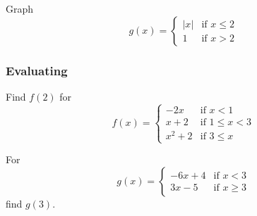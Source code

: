 \begin{exercise}
Graph
\[
g(x)=
\begin{cases}
\vert x\vert & \text{if }x\leq2\\
1 & \text{if }x>2
\end{cases}
\]
\end{exercise}
\ifprintanswers
\else
\begin{center}
\end{center}
\fi
\begin{solution}[1in]

\end{solution}

\newpage

\subsubsection*{Evaluating}

\begin{exercise}
Find $f(2)$ for
\[
f(x)=
\begin{cases}
-2x & \text{if }x<1\\
x+2 & \text{if }1\leq x<3\\
x^2+2 & \text{if }3\leq x
\end{cases}
\]
\end{exercise}
\begin{solution}[2in]

\end{solution}

\vspace{0.5em}

\begin{exercise}
For
\[
g(x)=
\begin{cases}
-6x+4 & \text{if }x<3\\
3x-5 & \text{if } x\geq3
\end{cases}
\]
find $g(3)$.
\end{exercise}
\begin{solution}[2in]

\end{solution}

